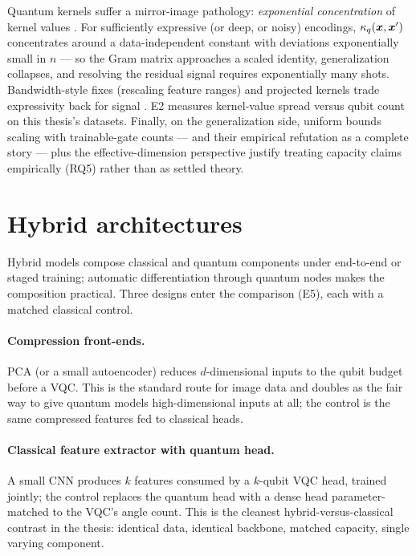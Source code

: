 Quantum kernels suffer a mirror-image pathology: \emph{exponential
concentration} of kernel values \citep{thanasilp2024concentration}. For
sufficiently expressive (or deep, or noisy) encodings, $\kappa_q(\bm{x},
\bm{x}')$ concentrates around a data-independent constant with deviations
exponentially small in $n$ --- so the Gram matrix approaches a scaled
identity, generalization collapses, and resolving the residual signal requires
exponentially many shots. Bandwidth-style fixes (rescaling feature ranges) and
projected kernels trade expressivity back for signal
\citep{kubler2021inductive, huang2021power}. E2 measures kernel-value spread
versus qubit count on this thesis's datasets. Finally, on the generalization
side, uniform bounds scaling with trainable-gate counts \citep{caro2022generalization}
--- and their empirical refutation as a complete story
\citep{gilfuster2024rethinking} --- plus the effective-dimension perspective
\citep{abbas2021power} justify treating capacity claims empirically (RQ5)
rather than as settled theory.

\section{Hybrid architectures}
\label{sec:qml-hybrid}

Hybrid models compose classical and quantum components under end-to-end or
staged training; automatic differentiation through quantum nodes
\citep{bergholm2018pennylane} makes the composition practical. Three designs
enter the comparison (E5), each with a matched classical control.

\paragraph{Compression front-ends.} PCA (or a small autoencoder) reduces
$d$-dimensional inputs to the qubit budget before a VQC. This is the standard
route for image data and doubles as the fair way to give quantum models
high-dimensional inputs at all; the control is the same compressed features
fed to classical heads.

\paragraph{Classical feature extractor with quantum head.} A small CNN
produces $k$ features consumed by a $k$-qubit VQC head, trained jointly; the
control replaces the quantum head with a dense head parameter-matched to the
VQC's angle count. This is the cleanest hybrid-versus-classical contrast in
the thesis: identical data, identical backbone, matched capacity, single
varying component.

